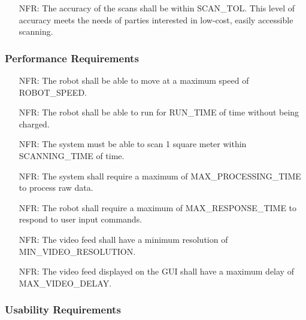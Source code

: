 \documentclass[12pt]{article}
\newcounter{nfrnum} %
\newcommand{\ScanningSpace}{1 square meter}
\begin{document}
\noindent \begin{itemize}
\item[NFR\refstepcounter{nfrnum}\thenfrnum\label{NFR_Accuracy1}:] The accuracy of the scans shall be within SCAN_TOL. This level of accuracy meets the needs of parties interested in low-cost, easily accessible scanning.
\end{itemize}

\subsubsection{Performance Requirements}

\noindent \begin{itemize}
\item[NFR\refstepcounter{nfrnum}\thenfrnum\label{NFR_Performance1}:] The robot shall be able to move at a maximum speed of ROBOT_SPEED.
\item[NFR\refstepcounter{nfrnum}\thenfrnum\label{NFR_Performance2}:] The robot shall be able to run for RUN_TIME of time without being charged.
\item[NFR\refstepcounter{nfrnum}\thenfrnum\label{NFR_Performance3}:] The system must be able to scan \ScanningSpace{} within SCANNING_TIME of time.
\item[NFR\refstepcounter{nfrnum}\thenfrnum\label{NFR_Performance4}:] The system shall require a maximum of MAX_PROCESSING_TIME to process raw data.
\item[NFR\refstepcounter{nfrnum}\thenfrnum\label{NFR_Performance5}:] The robot shall require a maximum of MAX_RESPONSE_TIME to respond to user input commands.
\item[NFR\refstepcounter{nfrnum}\thenfrnum\label{NFR_Performance6}:] The video feed shall have a minimum resolution of MIN_VIDEO_RESOLUTION.

\item[NFR\refstepcounter{nfrnum}\thenfrnum\label{NFR_Performance7}:] The video feed displayed on the GUI shall have a maximum delay of MAX_VIDEO_DELAY.
\end{itemize}

\subsubsection{Usability Requirements}
\end{document}
